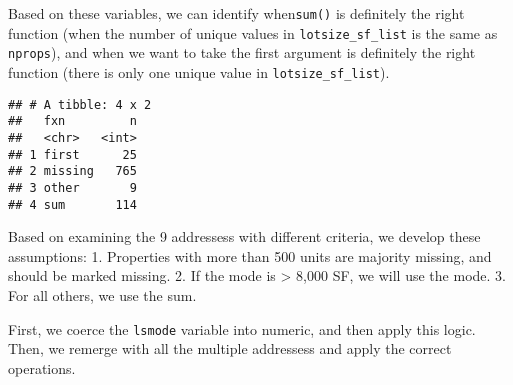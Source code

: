 \documentclass[]{article}
\newenvironment{Shaded}{\begin{snugshade}}{\end{snugshade}}
\newcommand{\KeywordTok}[1]{\textcolor[rgb]{0.13,0.29,0.53}{\textbf{#1}}}
\newcommand{\DataTypeTok}[1]{\textcolor[rgb]{0.13,0.29,0.53}{#1}}
\newcommand{\DecValTok}[1]{\textcolor[rgb]{0.00,0.00,0.81}{#1}}
\newcommand{\StringTok}[1]{\textcolor[rgb]{0.31,0.60,0.02}{#1}}
\newcommand{\OtherTok}[1]{\textcolor[rgb]{0.56,0.35,0.01}{#1}}
\newcommand{\OperatorTok}[1]{\textcolor[rgb]{0.81,0.36,0.00}{\textbf{#1}}}
\newcommand{\NormalTok}[1]{#1}
\begin{document}
Based on these variables, we can identify when\texttt{sum()} is
definitely the right function (when the number of unique values in
\texttt{lotsize\_sf\_list} is the same as \texttt{nprops}), and when we
want to take the first argument is definitely the right function (there
is only one unique value in \texttt{lotsize\_sf\_list}).

\begin{Shaded}
\end{Shaded}

\begin{verbatim}
## # A tibble: 4 x 2
##   fxn         n
##   <chr>   <int>
## 1 first      25
## 2 missing   765
## 3 other       9
## 4 sum       114
\end{verbatim}

\begin{Shaded}
\end{Shaded}

Based on examining the 9 addressess with different criteria, we develop
these assumptions: 1. Properties with more than 500 units are majority
missing, and should be marked missing. 2. If the mode is \textgreater{}
8,000 SF, we will use the mode. 3. For all others, we use the sum.

First, we coerce the \texttt{lsmode} variable into numeric, and then
apply this logic. Then, we remerge with all the multiple addressess and
apply the correct operations.
\end{document}
